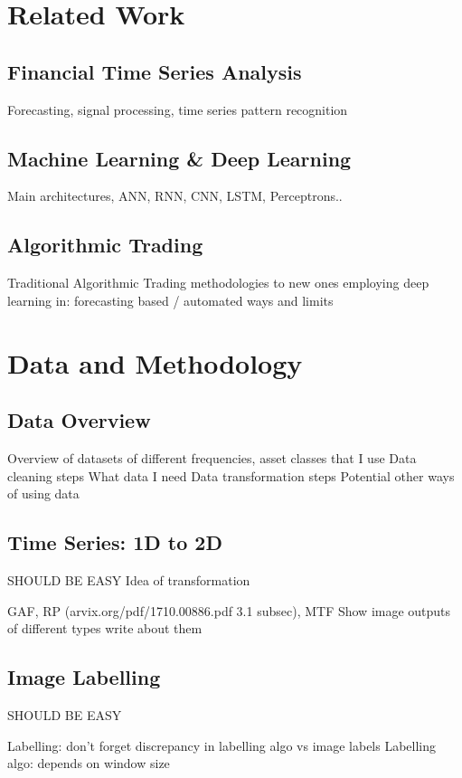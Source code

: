 \documentclass[11pt, a4paper]{article}
\begin{document}
\section{Related Work}


\subsection{Financial Time Series Analysis}
Forecasting, signal processing, time series pattern recognition

\subsection{Machine Learning \& Deep Learning}


Main architectures, ANN, RNN, CNN, LSTM, Perceptrons..


\subsection{Algorithmic Trading}
Traditional Algorithmic Trading methodologies to new ones employing deep learning in: forecasting based / automated ways and limits

\section{Data and Methodology}
\subsection{Data Overview}
Overview of datasets of different frequencies, asset classes that I use
Data cleaning steps
What data I need
Data transformation steps 
Potential other ways of using data

\subsection{Time Series: 1D to 2D}
SHOULD BE EASY
Idea of transformation

GAF, RP (arvix.org/pdf/1710.00886.pdf 3.1 subsec), MTF
Show image outputs of different types
write about them 

\subsection{Image Labelling}
SHOULD BE EASY

Labelling: don't forget discrepancy in labelling algo vs image labels
Labelling algo: depends on window size
\end{document}
